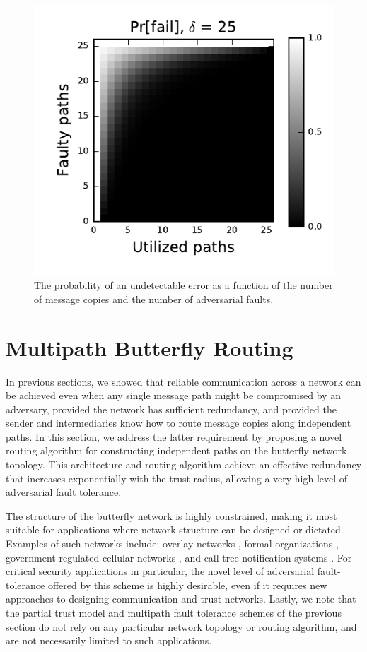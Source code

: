 \documentclass{sig-alternate-05-2015}
\begin{document}
\begin{figure}
\centerline{\includegraphics{fig-perror}}
\caption{
The probability of an undetectable error as a function of the number of
message copies and the number of adversarial faults.
}
\label{fig:pfail}
\end{figure}

\section{Multipath Butterfly Routing}

In previous sections, we showed that reliable communication across a network
can be achieved even when any single message path might be compromised by
an adversary,
provided the network has sufficient redundancy,
and provided the sender and intermediaries know how to route message
copies along independent paths.
In this section, we address the latter requirement by proposing a novel routing
algorithm for constructing independent paths on the butterfly network topology.
This architecture and routing algorithm achieve an
effective redundancy that increases exponentially with the trust radius,
allowing a very high level of adversarial fault tolerance.

The structure of the butterfly network is highly constrained,
making it most suitable for applications where network structure can be
designed or dictated.
Examples of such networks include:
overlay networks \cite{lua_survey_2005, korzun_structured_2013},
formal organizations \cite{mohr_explaining_1982},
government-regulated cellular networks \cite{walker_mass_2012},
and call tree notification systems \cite{nickerson_thinking_2010}.
For critical security applications in particular,
the novel level of adversarial fault-tolerance offered by this scheme
is highly desirable,
even if it requires new approaches to designing communication
and trust networks.
Lastly, we note that the partial trust model and multipath fault tolerance
schemes of the previous section do not rely on any particular network
topology or routing algorithm,
and are not necessarily limited to such applications.
\end{document}

